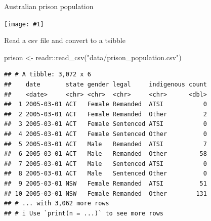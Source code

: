 \documentclass[14pt,ignorenonframetext,aspectratio=169]{beamer}
\newenvironment{Shaded}{\begin{snugshade}}{\end{snugshade}}
\newcommand{\FunctionTok}[1]{\textcolor[rgb]{0.00,0.00,0.00}{#1}}
\newcommand{\NormalTok}[1]{#1}
\newcommand{\OtherTok}[1]{\textcolor[rgb]{0.56,0.35,0.01}{#1}}
\newcommand{\SpecialCharTok}[1]{\textcolor[rgb]{0.00,0.00,0.00}{#1}}
\newcommand{\StringTok}[1]{\textcolor[rgb]{0.31,0.60,0.02}{#1}}
\renewenvironment{Shaded}{\color{black}\begin{snugshade}\color{black}}{\end{snugshade}}
\renewenvironment{Shaded}{\color{black}\fontsize{10}{10}\sf\begin{snugshade}\color{black}}{\end{snugshade}}
\def\fullwidth#1{\centerline{\texttt{[image: \#1]}}}
\begin{document}
\begin{frame}{Australian prison population}
\protect\hypertarget{australian-prison-population}{}
\fullwidth{Beechworth_prison}
\end{frame}

\begin{frame}[fragile]{Read a csv file and convert to a tsibble}
\protect\hypertarget{read-a-csv-file-and-convert-to-a-tsibble}{}
\fontsize{10}{11}\sf

\begin{Shaded}
\begin{Highlighting}[]
\NormalTok{prison }\OtherTok{\textless{}{-}}\NormalTok{ readr}\SpecialCharTok{::}\FunctionTok{read\_csv}\NormalTok{(}\StringTok{"data/prison\_population.csv"}\NormalTok{)}
\end{Highlighting}
\end{Shaded}

\begin{verbatim}
## # A tibble: 3,072 x 6
##    date       state gender legal     indigenous count
##    <date>     <chr> <chr>  <chr>     <chr>      <dbl>
##  1 2005-03-01 ACT   Female Remanded  ATSI           0
##  2 2005-03-01 ACT   Female Remanded  Other          2
##  3 2005-03-01 ACT   Female Sentenced ATSI           0
##  4 2005-03-01 ACT   Female Sentenced Other          0
##  5 2005-03-01 ACT   Male   Remanded  ATSI           7
##  6 2005-03-01 ACT   Male   Remanded  Other         58
##  7 2005-03-01 ACT   Male   Sentenced ATSI           0
##  8 2005-03-01 ACT   Male   Sentenced Other          0
##  9 2005-03-01 NSW   Female Remanded  ATSI          51
## 10 2005-03-01 NSW   Female Remanded  Other        131
## # ... with 3,062 more rows
## # i Use `print(n = ...)` to see more rows
\end{verbatim}
\end{frame}
\end{document}
